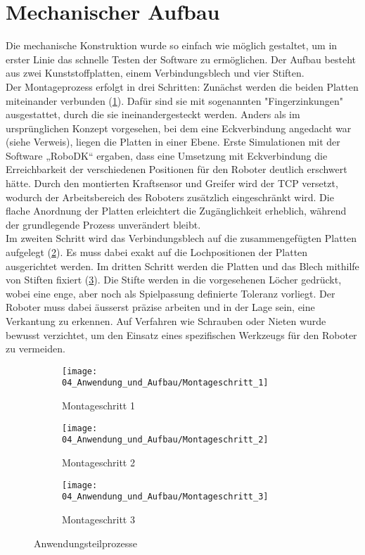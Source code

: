 \section{Mechanischer Aufbau} \label{Mechanischer_Aufbau}
	Die mechanische Konstruktion wurde so einfach wie möglich gestaltet, um in erster Linie das schnelle Testen der Software zu ermöglichen. Der Aufbau besteht aus zwei Kunststoffplatten, einem Verbindungsblech und vier Stiften.
	\\
	Der Montageprozess erfolgt in drei Schritten: Zunächst werden die beiden Platten miteinander verbunden (\ref{fig:Montageschritt 1}). Dafür sind sie mit sogenannten "Fingerzinkungen" ausgestattet, durch die sie ineinandergesteckt werden. Anders als im ursprünglichen Konzept vorgesehen, bei dem eine Eckverbindung angedacht war (siehe Verweis), liegen die Platten in einer Ebene. Erste Simulationen mit der Software „RoboDK“ ergaben, dass eine Umsetzung mit Eckverbindung die Erreichbarkeit der verschiedenen Positionen für den Roboter deutlich erschwert hätte. Durch den montierten Kraftsensor und Greifer wird der TCP versetzt, wodurch der Arbeitsbereich des Roboters zusätzlich eingeschränkt wird. Die flache Anordnung der Platten erleichtert die Zugänglichkeit erheblich, während der grundlegende Prozess unverändert bleibt.
	\\
	Im zweiten Schritt wird das Verbindungsblech auf die zusammengefügten Platten aufgelegt (\ref{fig:Montageschritt 2}). Es muss dabei exakt auf die Lochpositionen der Platten ausgerichtet werden. Im dritten Schritt werden die Platten und das Blech mithilfe von Stiften fixiert (\ref{fig:Montageschritt 3}). Die Stifte werden in die vorgesehenen Löcher gedrückt, wobei eine enge, aber noch als Spielpassung definierte Toleranz vorliegt. Der Roboter muss dabei äusserst präzise arbeiten und in der Lage sein, eine Verkantung zu erkennen. Auf Verfahren wie Schrauben oder Nieten wurde bewusst verzichtet, um den Einsatz eines spezifischen Werkzeugs für den Roboter zu vermeiden.
	
	 \begin{figure}[h!]
		\centering
		\begin{subfigure}[b]{0.3\textwidth}
			\centering
			\texttt{[image: 04\_Anwendung\_und\_Aufbau/Montageschritt\_1]}
			\caption{Montageschritt 1}
			\label{fig:Montageschritt 1}
		\end{subfigure}
		\hfill
		\begin{subfigure}[b]{0.3\textwidth}
			\centering
			\texttt{[image: 04\_Anwendung\_und\_Aufbau/Montageschritt\_2]}
			\caption{Montageschritt 2}
			\label{fig:Montageschritt 2}
		\end{subfigure}
		\hfill
		\begin{subfigure}[b]{0.3\textwidth}
			\centering
			\texttt{[image: 04\_Anwendung\_und\_Aufbau/Montageschritt\_3]}
			\caption{Montageschritt 3}
			\label{fig:Montageschritt 3}
		\end{subfigure}
		\caption{Anwendungsteilprozesse}
		\label{fig:Montageschritte}
	\end{figure}
	
